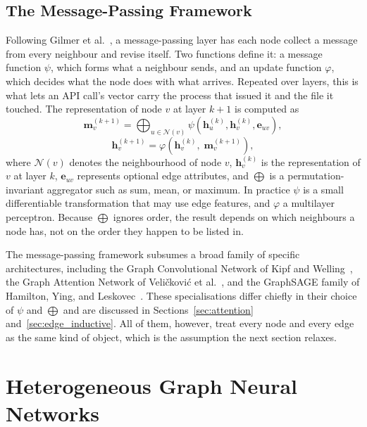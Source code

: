 \documentclass[%
    BCOR=10mm,
    DIV=13,
    toc=bibliography,
    toc=listof,
    oneside,
    12pt,
]{scrbook}
\begin{document}
\subsection{The Message-Passing Framework}
\label{subsec:mpnn}

Following Gilmer et al.~\cite{gilmer2017mpnn}, a message-passing layer has
each node collect a message from every neighbour and revise itself. Two
functions define it: a message function $\psi$, which forms what a neighbour
sends, and an update function $\varphi$, which decides what the node does with
what arrives. Repeated over layers, this is what lets an API call's vector
carry the process that issued it and the file it touched. The representation of
node $v$ at layer $k+1$ is computed as
\begin{equation}
  \mathbf{m}_v^{(k+1)} = \bigoplus_{u \in \mathcal{N}(v)}
    \psi\!\left( \mathbf{h}_u^{(k)}, \mathbf{h}_v^{(k)}, \mathbf{e}_{uv} \right),
  \label{eq:mpnn_agg}
\end{equation}
\begin{equation}
  \mathbf{h}_v^{(k+1)} = \varphi\!\left( \mathbf{h}_v^{(k)},\; \mathbf{m}_v^{(k+1)} \right),
  \label{eq:mpnn_update}
\end{equation}
where $\mathcal{N}(v)$ denotes the neighbourhood of node $v$,
$\mathbf{h}_v^{(k)}$ is the representation of $v$ at layer $k$,
$\mathbf{e}_{uv}$ represents optional edge attributes, and $\bigoplus$ is a
permutation-invariant aggregator such as sum, mean, or maximum. In practice
$\psi$ is a small differentiable transformation that may use edge features, and
$\varphi$ a multilayer perceptron. Because $\bigoplus$ ignores order, the result
depends on which neighbours a node has, not on the order they happen to be
listed in.

The message-passing framework subsumes a broad family of specific
architectures, including the Graph Convolutional Network of Kipf and
Welling~\cite{kipf2017gcn}, the Graph Attention Network of Veli\v{c}kovi\'{c}
et al.~\cite{velickovic2018gat}, and the GraphSAGE family of Hamilton, Ying,
and Leskovec~\cite{hamilton2017graphsage}. These specialisations differ
chiefly in their choice of $\psi$ and $\bigoplus$ and are discussed in
Sections~\ref{sec:attention} and~\ref{sec:edge_inductive}. All of them,
however, treat every node and every edge as the same kind of object, which is
the assumption the next section relaxes.

\section{Heterogeneous Graph Neural Networks}
\label{sec:heterogeneous_graphs}
\end{document}
